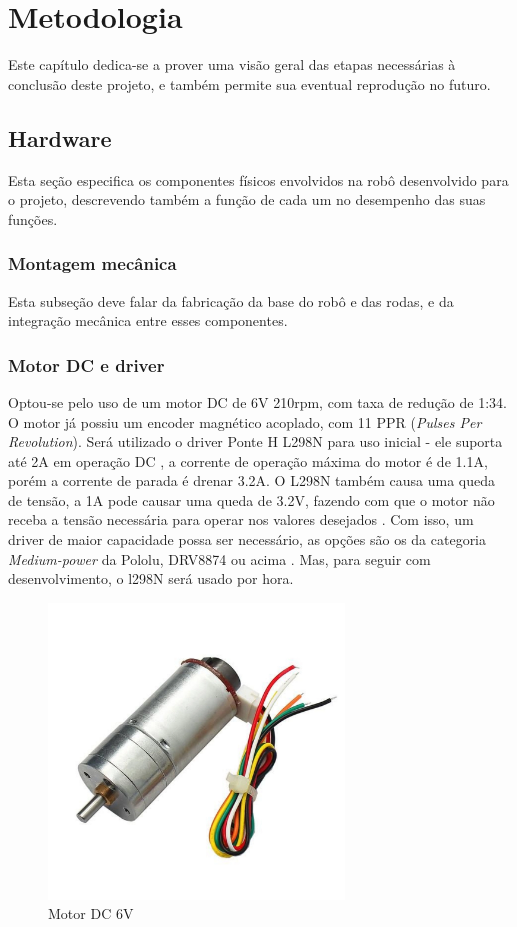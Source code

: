 
\chapter{Metodologia}

{\color{red} Este capítulo dedica-se a prover uma visão geral das etapas necessárias à conclusão deste projeto, e também
permite sua eventual reprodução no futuro.}

\section{Hardware}
{\color{red} Esta seção especifica os componentes físicos envolvidos na robô desenvolvido para o projeto, descrevendo 
também a função de cada um no desempenho das suas funções.}

\subsection{Montagem mecânica}
{\color{red} Esta subseção deve falar da fabricação da base do robô e das rodas, e da integração mecânica entre esses
componentes.}

\subsection{Motor DC e driver}
Optou-se pelo uso de um motor DC de 6V 210rpm, com taxa de redução de 1:34. O motor já possiu um encoder magnético
acoplado, com 11 PPR (\textit{Pulses Per Revolution}). Será utilizado o driver Ponte H L298N para uso inicial - ele
suporta até 2A em operação DC \cite{datasheel_l298n}, a corrente de operação máxima do motor é de 1.1A, porém a corrente
de parada é drenar 3.2A. O L298N também causa uma queda de tensão, a 1A pode causar uma queda de 3.2V, fazendo com que o
motor não receba a tensão necessária para operar nos valores desejados \cite{datasheel_l298n}. Com isso, um driver de
maior capacidade possa ser necessário, as opções são os da categoria \textit{Medium-power} da Pololu, DRV8874 ou acima
\cite{DRV8874}. Mas, para seguir com desenvolvimento, o l298N será usado por hora.

\begin{figure}[h]
	\centering
	\includegraphics[width=0.7\textwidth]{figures/CHR_GM25_370}
	\caption{Motor DC 6V \cite{motor_dc_6v_encoder}}
\end{figure}


